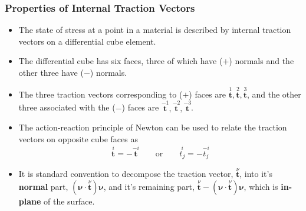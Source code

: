 \documentclass[11pt]{article}
\begin{document}
\subsubsection*{Properties of Internal Traction Vectors}
\label{sec:org704d952}
\begin{itemize}
\item The state of stress at a point in a material is described by internal traction vectors on a differential cube element.
\end{itemize}
\begin{itemize}
\item The differential cube has six faces, three of which have (\(+\)) normals and the other three have (\(-\)) normals.
\item The three traction vectors corresponding to (\(+\)) faces are  \(\overset{1}{\boldsymbol{t}}, \overset{2}{\boldsymbol{t}}, \overset{3}{\boldsymbol{t}}\), and the other three associated with the (\(-\)) faces are \(\overset{-1}{\boldsymbol{t}}, \overset{-2}{\boldsymbol{t}}, \overset{-3}{\boldsymbol{t}}\).
\item The action-reaction principle of Newton can be used to relate the traction vectors on opposite cube faces as
$$ \overset{i}{\boldsymbol{t}} = -\overset{-i}{\boldsymbol{t}} \hspace{2em} \mathrm{or} \hspace{2em} \overset{i}{t_j} = -\overset{-i}{t_j} $$
\item It is standard convention to decompose the traction vector, \(\overset{\nu}{\boldsymbol{t}}\), into it's \textbf{normal} part, \((\boldsymbol{\nu} \cdot \overset{\nu}{\boldsymbol{t}}) \boldsymbol{\nu}\), and it's remaining part, \(\overset{\nu}{\boldsymbol{t}} - (\boldsymbol{\nu} \cdot \overset{\nu}{\boldsymbol{t}}) \boldsymbol{\nu}\), which is \textbf{in-plane} of the surface.
\end{itemize}
\end{document}
